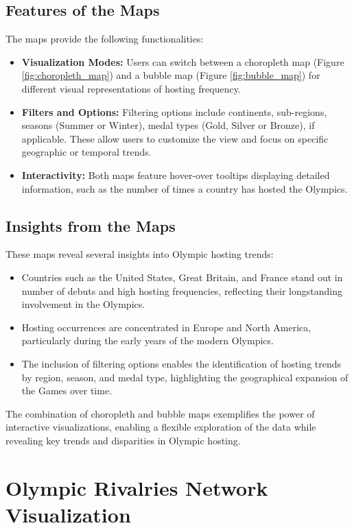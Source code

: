 \subsection{Features of the Maps}

The maps provide the following functionalities:
\begin{itemize}
    \item \textbf{Visualization Modes:} Users can switch between a choropleth map (Figure \ref{fig:choropleth_map}) and a bubble map (Figure \ref{fig:bubble_map}) for different visual representations of hosting frequency.
    \item \textbf{Filters and Options:} Filtering options include continents, sub-regions, seasons (Summer or Winter), medal types (Gold, Silver or Bronze), if applicable. These allow users to customize the view and focus on specific geographic or temporal trends.
    \item \textbf{Interactivity:} Both maps feature hover-over tooltips displaying detailed information, such as the number of times a country has hosted the Olympics.
\end{itemize}

\subsection{Insights from the Maps}

These maps reveal several insights into Olympic hosting trends:
\begin{itemize}
    \item Countries such as the United States, Great Britain, and France stand out in number of debuts and high hosting frequencies, reflecting their longstanding involvement in the Olympics.
    \item Hosting occurrences are concentrated in Europe and North America, particularly during the early years of the modern Olympics.
    \item The inclusion of filtering options enables the identification of hosting trends by region, season, and medal type, highlighting the geographical expansion of the Games over time.
\end{itemize}

The combination of choropleth and bubble maps exemplifies the power of interactive visualizations, enabling a flexible exploration of the data while revealing key trends and disparities in Olympic hosting.

\section{Olympic Rivalries Network Visualization}

